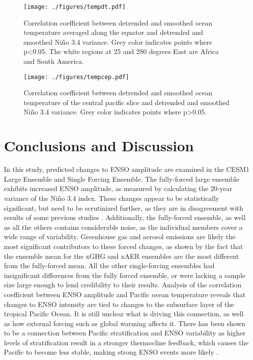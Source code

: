 \documentclass[12pt]{article}
\begin{document}
\begin{figure}[htbp]
\centering
\texttt{[image: ./figures/tempdt.pdf]}
\caption{\label{fig:tempdt_1}Correlation coefficient between detrended and smoothed ocean temperature averaged along the equator and detrended and smoothed Niño 3.4 variance. Grey color indicates points where p<0.05. The white regions at 25 and 280 degrees East are Africa and South America.}
\end{figure}

\begin{figure}[htbp]
\centering
\texttt{[image: ./figures/tempcep.pdf]}
\caption{\label{fig:tempcep_1}Correlation coefficient between detrended and smoothed ocean temperature of the central pacific slice and detrended and smoothed Niño 3.4 variance. Grey color indicates points where p>0.05.}
\end{figure}

\section{Conclusions and Discussion}

In this study, predicted changes to ENSO amplitude are examined in the CESM1 Large Ensemble and Single Forcing Ensemble. The fully-forced large ensemble exhibits increased ENSO amplitude, as measured by calculating the 20-year variance of the Niño 3.4 index. These changes appear to be statistically significant, but need to be scrutinized further, as they are in disagreement with results of some previous studies \parencite{stevenson2012significant}. Additionally, the fully-forced ensemble, as well as all the others contains considerable noise, as the individual members cover a wide range of variability. Greenhouse gas and aerosol emissions are likely the most significant contributors to these forced changes, as shown by the fact that the ensemble mean for the xGHG and xAER ensembles are the most different from the fully-forced mean. All the other single-forcing ensembles had insignificant differences from the fully forced ensemble, or were lacking a sample size large enough to lend credibility to their results. Analysis of the correlation coefficient between ENSO amplitude and Pacific ocean temperature reveals that changes to ENSO intensity are tied to changes to the subsurface layer of the tropical Pacific Ocean. It is still unclear what is driving this connection, as well as how external forcing such as global warming affects it. There has been shown to be a connection between Pacific stratification and ENSO variability as higher levels of stratification result in a stronger thermocline feedback, which causes the Pacific to become less stable, making strong ENSO events more likely \parencite{dewitte2013reinterpreting}.
\end{document}
